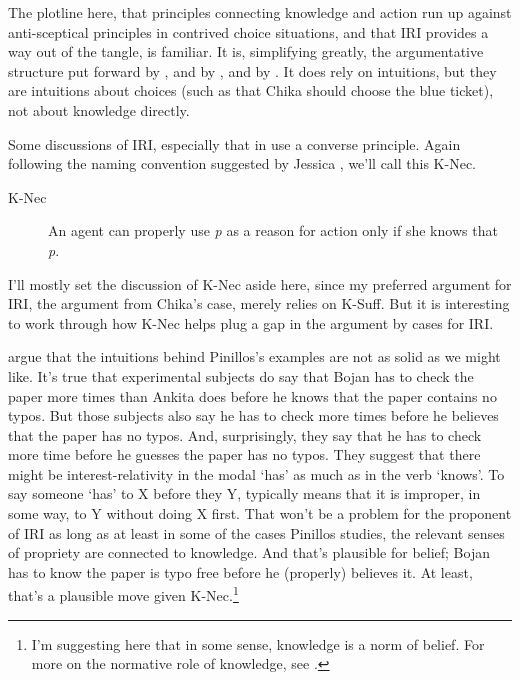 \documentclass[11pt,oneside]{book}
\begin{document}
The plotline here, that principles connecting knowledge and action run up against anti-sceptical principles in contrived choice situations, and that IRI provides a way out of the tangle, is familiar. It is, simplifying greatly, the argumentative structure put forward by  \citet{Hawthorne2004}, and by  \citet{FantlMcGrath2002, FantlMcGrath2009}, and by  \citet{Weatherson2012}. It does rely on intuitions, but they are intuitions about choices (such as that Chika should choose the blue ticket), not about knowledge directly.

Some discussions of IRI, especially that in  \citet{HawthorneStanley2008} use a converse principle. Again following the naming convention suggested by Jessica  \citet{Brown2013}, we'll call this K-Nec.

\begin{description}

\item[K-Nec]

An agent can properly use \emph{p} as a reason for action only if she knows that \emph{p}.
\end{description}
I'll mostly set the discussion of K-Nec aside here, since my preferred argument for IRI, the argument from Chika's case, merely relies on K-Suff. But it is interesting to work through how K-Nec helps plug a gap in the argument by cases for IRI.

 \citet{BuckwalterSchaffer2015} argue that the intuitions behind Pinillos's examples are not as solid as we might like. It's true that experimental subjects do say that Bojan has to check the paper more times than Ankita does before he knows that the paper contains no typos. But those subjects also say he has to check more times before he believes that the paper has no typos. And, surprisingly, they say that he has to check more time before he guesses the paper has no typos. They suggest that there might be interest-relativity in the modal `has' as much as in the verb `knows'. To say someone `has' to X before they Y, typically means that it is improper, in some way, to Y without doing X first. That won't be a problem for the proponent of IRI as long as at least in some of the cases Pinillos studies, the relevant senses of propriety are connected to knowledge. And that's plausible for belief; Bojan has to know the paper is typo free before he (properly) believes it. At least, that's a plausible move given K-Nec.\footnote{I'm suggesting here that in some sense, knowledge is a norm of belief. For more on the normative role of knowledge, see  \citet{Worsnip2016}.}
\end{document}
